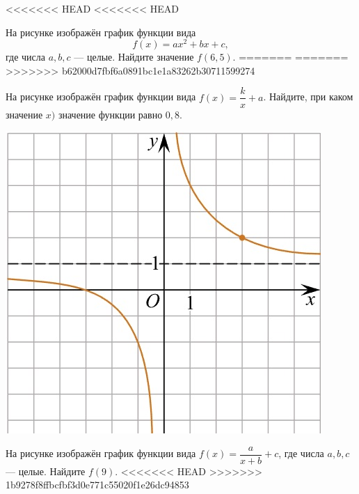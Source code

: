 \newpage
%
%
\begin{class}[number=5]
	\begin{listofex}
		\newpage
		\item
<<<<<<< HEAD
<<<<<<< HEAD
		\begin{minipage}[t]{\bodywidth}
			На рисунке изображён график функции вида \[ f(x)=ax^2+bx+c, \] где числа \(a, b, c\) --- целые. Найдите значение \(f(6,5)\).
=======
=======
>>>>>>> b62000d7fbf6a0891bc1e1a83262b30711599274
		\begin{minipage}[t]{0.43\textwidth}
			На рисунке изображён график функции вида \(f(x)=\dfrac{k}{x}+a\). Найдите, при каком значение \(x)\) значение функции равно \(0,8\).
		\end{minipage}
		\begin{minipage}[c]{0.25\textwidth}
			\includegraphics[align=t, width=\textwidth]{../pics/G101M4C5-1.jpg}
		\end{minipage}
		\item
		\begin{minipage}[t]{0.43\textwidth}
			На рисунке изображён график функции вида \(f(x)=\dfrac{a}{x+b}+c\), где числа \(a, b, c\) --- целые. Найдите \(f(9)\).
<<<<<<< HEAD
>>>>>>> 1b9278f8ffbcfbf3d0e771c55020f1e26dc94853
		\end{minipage}
		\hspace{0.05\linewidth}

\end{minipage}
\end{listofex}
\end{class}
